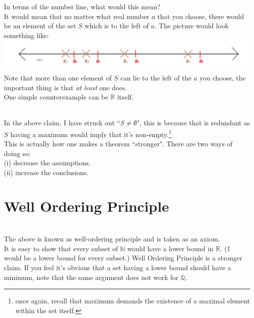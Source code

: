 In terms of the number line, what would this mean?\\
It would mean that no matter what real number $a$ that you choose, there would be an element of the set $S$ which is to the left of $a$. The picture would look something like:\\
\includegraphics[width=18 cm]{images/nolowerbound.jpg}\\
Note that more than one element of $S$ can lie to the left of the $a$ you choose, the important thing is that \textit{at least} one does.\\
One simple counterexample can be $\mathbb{R}$ itself.

\hrulefill
{}

\hrulefill

\\
In the above claim, I have struck out ``$S \neq \emptyset$", this is because that is redundant as $S$ having a maximum would imply that it's non-empty.\footnote{once again, recall that maximum demands the existence of a maximal element within the set itself.}\\
This is actually how one makes a theorem ``stronger". There are two ways of doing so:\\
(i) decrease the assumptions.\\
(ii) increase the conclusions.
%
\section{Well Ordering Principle}\label{sec:wop}
\\
The above is known as well-ordering principle and is taken as an axiom.\\
It is easy to show that every subset of $\mathbb{N}$ would have a lower bound in $\mathbb{R}$. (1 would be a lower bound for every subset.) Well Ordering Principle is a stronger claim. If you feel it's obvious that a set having a lower bound should have a minimum, note that the same argument does not work for $\mathbb{Q}$.
%
